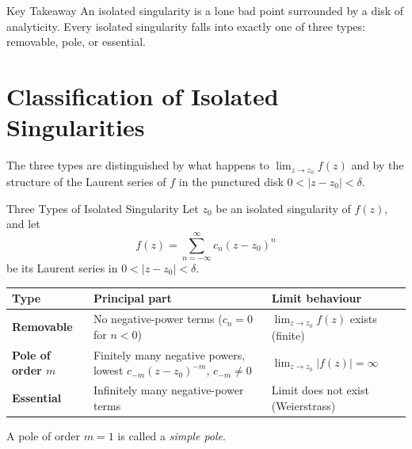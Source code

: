 \documentclass[12pt,a4paper]{article}
\begin{document}
\begin{center}
\end{center}

\begin{learnbox}{Key Takeaway}
An isolated singularity is a lone bad point surrounded by a disk of analyticity.
Every isolated singularity falls into exactly one of three types: removable, pole, or essential.
\end{learnbox}

\section{Classification of Isolated Singularities}

The three types are distinguished by what happens to $\lim_{z\to z_0} f(z)$ and by the structure
of the Laurent series of $f$ in the punctured disk $0 < |z - z_0| < \delta$.

\begin{infobox}{Three Types of Isolated Singularity}
Let $z_0$ be an isolated singularity of $f(z)$, and let
\[
  f(z) = \sum_{n=-\infty}^{\infty} c_n (z-z_0)^n
\]
be its Laurent series in $0 < |z-z_0| < \delta$.

\begin{center}
\renewcommand{\arraystretch}{1.4}
\begin{tabular}{>{\bfseries}l l l}
\toprule
Type & Principal part & Limit behaviour \\
\midrule
Removable & No negative-power terms ($c_n = 0$ for $n < 0$) & $\lim_{z\to z_0} f(z)$ exists (finite) \\
Pole of order $m$ & Finitely many negative powers, lowest $c_{-m}(z-z_0)^{-m}$, $c_{-m}\neq 0$ & $\lim_{z\to z_0}|f(z)| = \infty$ \\
Essential & Infinitely many negative-power terms & Limit does not exist (Weierstrass) \\
\bottomrule
\end{tabular}
\end{center}

A pole of order $m=1$ is called a \emph{simple pole}.
\end{infobox}
\end{document}
